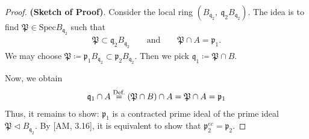 \documentclass[12pt,a4paper,footinclude=true,headinclude=true]{scrbook} %
\newcommand\myeq[1]{\stackrel{\textnormal{#1}}{=}}
\begin{document}
\begin{proof}
    \textbf{(Sketch of Proof)}. 
    Consider the local ring $(B_{\mathfrak{q}_2},\ \mathfrak{q}_2B_{\mathfrak{q}_2})$. The idea is to find $\mathfrak{P}\in\mathrm{Spec}B_{\mathfrak{q}_2}$ such that
    \begin{align*}
        \mathfrak{P}\subset\mathfrak{q}_2B_{\mathfrak{q}_2}\qquad\text{and} \qquad \mathfrak{P}\cap A=\mathfrak{p}_1.    
    \end{align*}
    We may choose $\mathfrak{P}\coloneqq\mathfrak{p}_1B_{\mathfrak{q}_2}\subset\mathfrak{p_2}B_{\mathfrak{q}_2}$. Then we pick $\mathfrak{q}_1\coloneqq\mathfrak{P}\cap B$.
    \begin{center}
    \end{center}    
    Now, we obtain
    \begin{align*}
        \mathfrak{q}_1\cap A\myeq{\text{Def.}} (\mathfrak{P}\cap B)\cap A =\mathfrak{P}\cap A=\mathfrak{p}_1
    \end{align*}
    Thus, it remains to show: $\mathfrak{p}_1$ is a contracted prime ideal of the prime ideal $\mathfrak{P}\triangleleft B_{\mathfrak{q}_2}$. By [AM, 3.16], it is equivalent to show that $\mathfrak{p}_2^{ec}=\mathfrak{p}_2$.
\end{proof}
\end{document}
